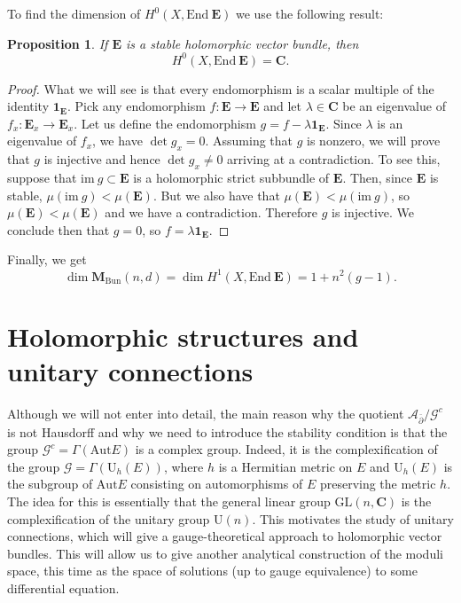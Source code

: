 \documentclass[12pt,a4paper]{book}
\newtheorem{prop}[thm]{Proposition}
\theoremstyle{definition} \newtheorem{defn}[thm]{Definition}
\theoremstyle{definition} \newtheorem{ejemplo}[thm]{Example}
\theoremstyle{remark} \newtheorem{rem}[thm]{Remark}
\def\AA{\mathscr{A}}
\def\GG{\mathscr{G}}
\def\CC{\mathbf{C}}
\def\id{\mathbf{1}}
\def\im{\mathrm{im}\ }
\def\End{\mathrm{End}}
\def\Aut{\mathrm{Aut}}
\def\UU{\mathrm{U}}
\def\Bun{\mathbf{M}_{\mathrm{Bun}}}
\def\delbar{\bar{\partial}}
\newcommand{\ve}[1]{\mathbf{#1}}
\begin{document}
	   To find the dimension of $H^0(X,\End\ \ve{E})$ we use the following result:
	   \begin{prop}
	     If $\ve{E}$ is a stable holomorphic vector bundle, then
	     \begin{equation*}
	       H^0(X,\End\ \ve{E})=\CC.
	     \end{equation*}
	   \end{prop}
	   \begin{proof}
	     What we will see is that every endomorphism is a scalar multiple of the identity $\id_{\ve{E}}$. Pick any endomorphism $f:\ve{E}\rightarrow \ve{E}$ and let $\lambda \in \CC$ be an eigenvalue of $f_x:\ve{E}_x \rightarrow \ve{E}_x$. Let us define the endomorphism $g=f-\lambda \id_{\ve{E}}$. Since $\lambda$ is an eigenvalue of $f_x$, we have $\det g_x=0$. 
	     Assuming that $g$ is nonzero, we will prove that $g$ is injective and hence $\det g_x\neq 0$ arriving at a contradiction.
	     To see this, suppose that $\im g \subset \ve{E}$ is a holomorphic strict subbundle of $\ve{E}$. Then, since $\ve{E}$ is stable, $\mu(\im g) < \mu(\ve{E})$. But we also have that $\mu(\ve{E})<\mu(\im g)$, so $\mu(\ve{E})<\mu(\ve{E})$ and we have a contradiction. Therefore $g$ is injective.	     
	     We conclude then that $g=0$, so $f=\lambda\id_{\ve{E}}$.
	   \end{proof}

	   Finally, we get
	   \begin{equation*}
	     \dim \Bun(n,d)=\dim H^1(X,\End\ \ve{E})= 1+n^2(g-1).
	   \end{equation*}

	   \section{Holomorphic structures and unitary connections}
	   Although we will not enter into detail, the main reason why the quotient $\AA_{\delbar}/\GG^c$ is not Hausdorff and why we need to introduce the stability condition is that the group $\GG^c=\Gamma(\Aut E)$ is a complex group. Indeed, it is the complexification of the group $\GG=\Gamma(\UU_h(E))$, where $h$ is a Hermitian metric on $E$ and $\UU_h(E)$ is the subgroup of $\Aut E$ consisting on automorphisms of $E$ preserving the metric $h$. The idea for this is essentially that the general linear group $\mathrm{GL}(n,\CC)$ is the complexification of the unitary group $\mathrm{U}(n)$. This motivates the study of unitary connections,
which will give a gauge-theoretical approach to holomorphic vector bundles. This will allow us to give another analytical construction of the moduli space, this time as the space of solutions (up to gauge equivalence) to some differential equation.
\end{document}
